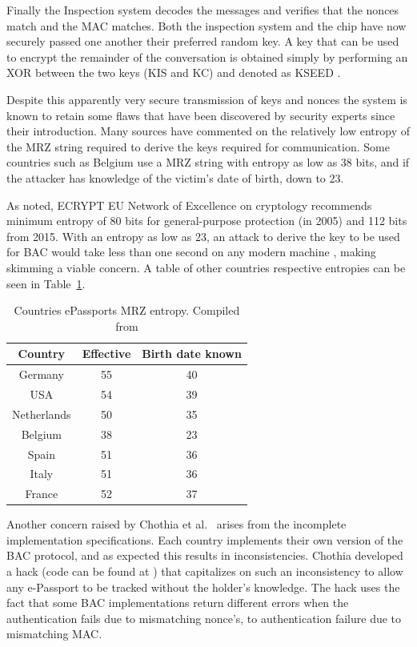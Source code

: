 \documentclass[12pt]{article}
\begin{document}
Finally the Inspection system decodes the messages and verifies that the nonces match and the MAC matches. Both the inspection system and the chip have now securely passed one another their preferred random key. A key that can be used to encrypt the remainder of the conversation is obtained simply by performing an XOR between the two keys (KIS and KC) and denoted as KSEED \cite{Chothia:2010wf}.
 

Despite this apparently very secure transmission of keys and nonces the system is known to retain some flaws that have been discovered by security experts since their introduction. Many sources \cite{Juels:2005wf, Avoine:2008wf} have commented on the relatively low entropy of the MRZ string required to derive the keys required for communication. Some countries such as Belgium use a MRZ string with entropy as low as 38 bits, and if the attacker has knowledge of the victim's date of birth, down to 23.

As \cite{Hoepman:2006tg} noted, ECRYPT EU Network of Excellence on cryptology recommends minimum entropy of 80 bits for general-purpose protection (in 2005) and 112 bits from 2015. With an entropy as low as 23, an attack to derive the key to be used for BAC would take less than one second on any modern machine \cite{Avoine:2008wf}, making skimming a viable concern. A table of other countries respective entropies can be seen in Table~\ref{tab:MRZ-entropy}.

\begin{table}
    \centering
    \begin{tabular}{|c|c|c|}
        \hline
        Country&Effective&Birth date known\\
        \hline
        Germany&55&40\\
        \hline
        USA&54&39\\
        \hline
        Netherlands&50&35\\
        \hline
        Belgium&38&23\\
        \hline
        Spain&51&36\\
        \hline
        Italy&51&36\\
        \hline
        France&52&37\\
        \hline
    \end{tabular}
    \caption{Countries ePassports MRZ entropy. Compiled from \cite{deladefencenationale:2008wf, Avoine:2008wf}}
    \label{tab:MRZ-entropy}
\end{table}

Another concern raised by Chothia et al.\ \cite{Chothia:2010wf} arises from the incomplete implementation specifications. Each country implements their own version of the BAC protocol, and as expected this results in inconsistencies. Chothia developed a hack (code can be found at \cite{ChothiaPassportAtt:wz}) that capitalizes on such an inconsistency to allow any e-Passport to be tracked without the holder's knowledge. The hack uses the fact that some BAC implementations return different errors when the authentication fails due to mismatching nonce's, to authentication failure due to mismatching MAC.
\end{document}
